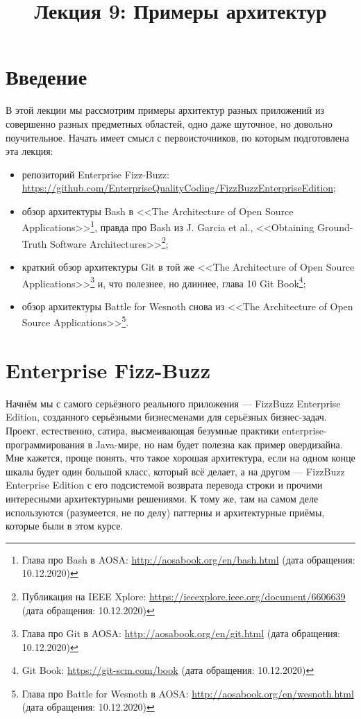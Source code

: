 \documentclass[a5paper]{article}
\title{Лекция 9: Примеры архитектур}
\date{}
\begin{document}
\maketitle
\thispagestyle{empty}

\section{Введение}

В этой лекции мы рассмотрим примеры архитектур разных приложений из совершенно разных предметных областей, одно даже шуточное, но довольно поучительное. Начать имеет смысл с первоисточников, по которым подготовлена эта лекция:
\begin{itemize}
    \item репозиторий Enterprise Fizz-Buzz: \url{https://github.com/EnterpriseQualityCoding/FizzBuzzEnterpriseEdition};
    \item обзор архитектуры Bash в <<The Architecture of Open Source Applications>>\footnote{Глава про Bash в AOSA: \url{http://aosabook.org/en/bash.html} (дата обращения: 10.12.2020)}, правда про Bash из J. Garcia et al., <<Obtaining Ground-Truth Software Architectures>>\footnote{Публикация на IEEE Xplore: \url{https://ieeexplore.ieee.org/document/6606639} (дата обращения: 10.12.2020)};
    \item краткий обзор архитектуры Git в той же <<The Architecture of Open Source Applications>>\footnote{Глава про Git в AOSA: \url{http://aosabook.org/en/git.html} (дата обращения: 10.12.2020)} и, что полезнее, но длиннее, глава 10 Git Book\footnote{Git Book: \url{https://git-scm.com/book} (дата обращения: 10.12.2020)};
    \item обзор архитектуры Battle for Wesnoth снова из <<The Architecture of Open Source Applications>>\footnote{Глава про Battle for Wesnoth в AOSA: \url{http://aosabook.org/en/wesnoth.html} (дата обращения: 10.12.2020)}.
\end{itemize}

\section{Enterprise Fizz-Buzz}

 Начнём мы с самого серьёзного реального приложения --- FizzBuzz Enterprise Edition, созданного серьёзными бизнесменами для серьёзных бизнес-задач. Проект, естественно, сатира, высмеивающая безумные практики enterprise-программирования в Java-мире, но нам будет полезна как пример овердизайна. Мне кажется, проще понять, что такое хорошая архитектура, если на одном конце шкалы будет один большой класс, который всё делает, а на другом --- FizzBuzz Enterprise Edition с его подсистемой возврата перевода строки и прочими интересными архитектурными решениями. К тому же, там на самом деле используются (разумеется, не по делу) паттерны и архитектурные приёмы, которые были в этом курсе.
\end{document}
